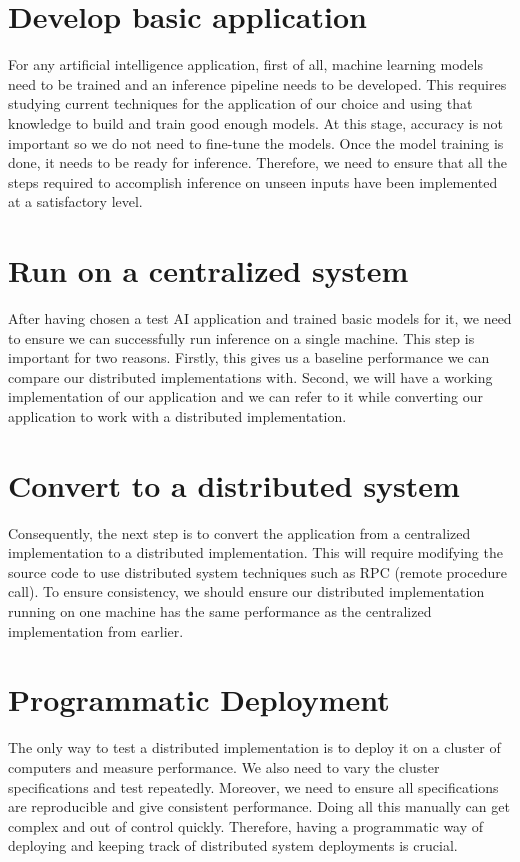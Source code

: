 \documentclass{report}
\begin{document}
\section{Develop basic application}
For any artificial intelligence application, first of all, machine learning models need to be trained and an inference pipeline needs to be developed.
This requires studying current techniques for the application of our choice and using that knowledge to build and train good enough models.
At this stage, accuracy is not important so we do not need to fine-tune the models.
Once the model training is done, it needs to be ready for inference.
Therefore, we need to ensure that all the steps required to accomplish inference on unseen inputs have been implemented at a satisfactory level.

\section{Run on a centralized system}
After having chosen a test AI application and trained basic models for it, we need to ensure we can successfully run inference on a single machine.
This step is important for two reasons.
Firstly, this gives us a baseline performance we can compare our distributed implementations with.
Second, we will have a working implementation of our application and we can refer to it while converting our application to work with a distributed implementation.

\section{Convert to a distributed system}
Consequently, the next step is to convert the application from a centralized implementation to a distributed implementation.
This will require modifying the source code to use distributed system techniques such as RPC (remote procedure call).
To ensure consistency, we should ensure our distributed implementation running on one machine has the same performance as the centralized implementation from earlier.

\section{Programmatic Deployment}
The only way to test a distributed implementation is to deploy it on a cluster of computers and measure performance.
We also need to vary the cluster specifications and test repeatedly.
Moreover, we need to ensure all specifications are reproducible and give consistent performance.
Doing all this manually can get complex and out of control quickly.
Therefore, having a programmatic way of deploying and keeping track of distributed system deployments is crucial.
\end{document}
